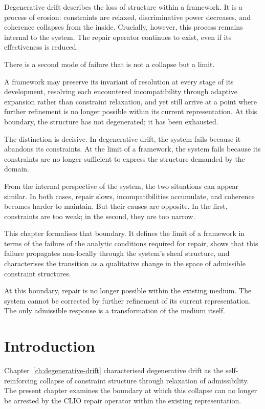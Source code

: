\documentclass[11pt,openany]{book}
\begin{document}
Degenerative drift describes the loss of structure within a
framework.  It is a process of erosion: constraints are
relaxed, discriminative power decreases, and coherence
collapses from the inside.  Crucially, however, this process
remains internal to the system.  The repair operator
continues to exist, even if its effectiveness is reduced.

There is a second mode of failure that is not a collapse but
a limit.

A framework may preserve its invariant of resolution at
every stage of its development, resolving each encountered
incompatibility through adaptive expansion rather than
constraint relaxation, and yet still arrive at a point where
further refinement is no longer possible within its current
representation.  At this boundary, the structure has not
degenerated; it has been exhausted.

The distinction is decisive.  In degenerative drift, the
system fails because it abandons its constraints.  At the
limit of a framework, the system fails because its
constraints are no longer sufficient to express the
structure demanded by the domain.

From the internal perspective of the system, the two
situations can appear similar.  In both cases, repair slows,
incompatibilities accumulate, and coherence becomes harder
to maintain.  But their causes are opposite.  In the first,
constraints are too weak; in the second, they are too
narrow.

This chapter formalises that boundary.  It defines the limit
of a framework in terms of the failure of the analytic
conditions required for repair, shows that this failure
propagates non-locally through the system's sheaf structure,
and characterises the transition as a qualitative change in
the space of admissible constraint structures.

At this boundary, repair is no longer possible within the
existing medium.  The system cannot be corrected by further
refinement of its current representation.  The only
admissible response is a transformation of the medium
itself.

\section{Introduction}
\label{sec:intro-phase}

Chapter~\ref{ch:degenerative-drift} characterised
degenerative drift as the self-reinforcing collapse of
constraint structure through relaxation of admissibility.
The present chapter examines the boundary at which this
collapse can no longer be arrested by the CLIO repair
operator within the existing representation.
\end{document}
